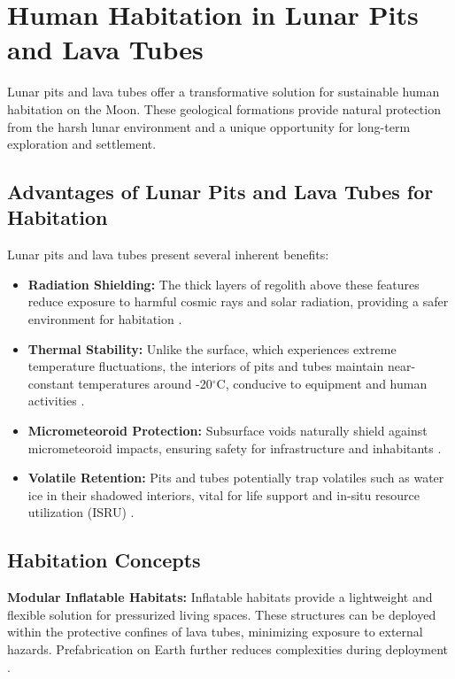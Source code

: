 \graphicspath{{img/ch6}}

\section{Human Habitation in Lunar Pits and Lava Tubes}

Lunar pits and lava tubes offer a transformative solution for sustainable human habitation on the Moon. These geological formations provide natural protection from the harsh lunar environment and a unique opportunity for long-term exploration and settlement.

\subsection{Advantages of Lunar Pits and Lava Tubes for Habitation}

Lunar pits and lava tubes present several inherent benefits:
\begin{itemize}
    \item \textbf{Radiation Shielding:} The thick layers of regolith above these features reduce exposure to harmful cosmic rays and solar radiation, providing a safer environment for habitation \cite{thermal-lunar-pits}.
    \item \textbf{Thermal Stability:} Unlike the surface, which experiences extreme temperature fluctuations, the interiors of pits and tubes maintain near-constant temperatures around -20$^\circ$C, conducive to equipment and human activities \cite{thermal-lunar-pits}.
    \item \textbf{Micrometeoroid Protection:} Subsurface voids naturally shield against micrometeoroid impacts, ensuring safety for infrastructure and inhabitants \cite{lunar-pits-entrances-to-caves}.
    \item \textbf{Volatile Retention:} Pits and tubes potentially trap volatiles such as water ice in their shadowed interiors, vital for life support and in-situ resource utilization (ISRU) \cite{newer-thermal}.
\end{itemize}

\subsection{Habitation Concepts}

\textbf{Modular Inflatable Habitats:}  
Inflatable habitats provide a lightweight and flexible solution for pressurized living spaces. These structures can be deployed within the protective confines of lava tubes, minimizing exposure to external hazards. Prefabrication on Earth further reduces complexities during deployment \cite{bases-feng}.

